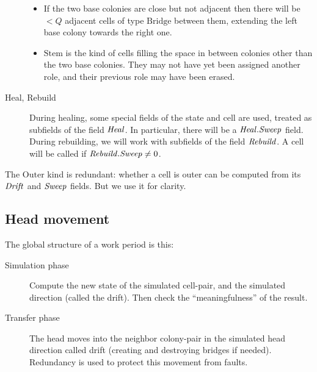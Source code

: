 \documentclass[11pt]{memoir}
\theoremstyle{definition} %
\newcommand{\fld}[1]{\ensuremath{\textit{#1\/}}}
\newcommand{\Q}{Q} %
\newcommand{\BridgeDir}{\fld{BridgeDir}}
\newcommand{\Drift}{\fld{Drift}}
\newcommand{\Heal}{\fld{Heal}} %
\newcommand{\Rebuild}{\fld{Rebuild}} %
\newcommand{\Sweep}{\fld{Sweep}} %
\newcommand{\Stem}{\mathrm{Stem}}
\newcommand{\Bridge}{\mathrm{Bridge}}
\newcommand{\Outer}{\mathrm{Outer}}
\begin{document}
\begin{description}
\begin{itemize}
\item If the two base colonies are close but not adjacent then there will be \( <\Q \)
  adjacent cells of type \( \Bridge \) between them, extending the left
  base colony towards the right one.

\item \( \Stem \) is the kind of cells filling the space in between colonies other than the two base colonies.
  They may not have yet been assigned another role, and their previous role may have been erased.
\end{itemize}

\item[Heal, Rebuild] During healing, some special fields of the state and cell are used,
  treated as subfields of the field \( \Heal \).
In particular, there will be a \( \Heal.\Sweep \) field.
During rebuilding, we will work with subfields of the field \( \Rebuild \).
A cell will be called  if \( \Rebuild.\Sweep\ne 0 \).

\end{description}

\begin{remark}
  The \( \Outer \) kind is redundant:
  whether a cell is outer can be computed from its \( \Drift \) and \( \Sweep \) fields.
  But we use it for clarity.
\end{remark}

\subsection{Head movement}\label{sec:sweep}

The global structure of a work period is this:
\begin{description}

\item[Simulation phase]
Compute the new state of the simulated cell-pair, and the simulated direction (called the drift).
Then check the ``meaningfulness'' of the result.

\item[Transfer phase]
  The head moves into the neighbor colony-pair
  in the simulated head direction called drift (creating and destroying bridges if needed).
  Redundancy is used to protect this movement from faults.
\end{description}
\end{document}
